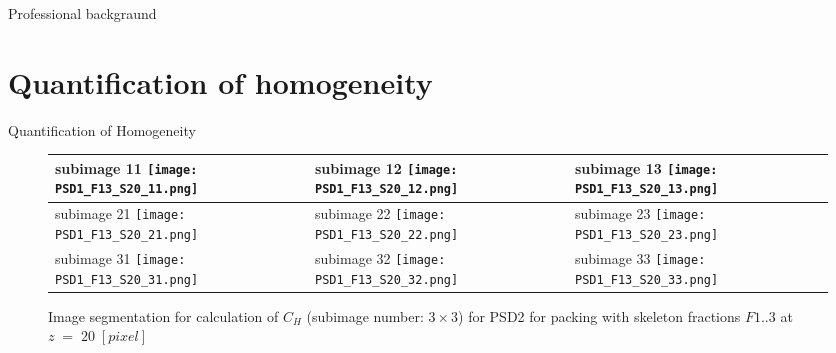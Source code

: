 \documentclass[10pt,xcolor=dvipsnames]{beamer}
\begin{document}
{\begin{frame}{Professional backgraund}
{
\section{Quantification of homogeneity}
}
{
\begin{frame}{Quantification of Homogeneity}

	\begin{figure}[H]
\centering
\begin{tabular}{ p{1.9cm} | p{1.9cm} | p{1.9cm}}

subimage 11 \newline 
\texttt{[image: PSD1\_F13\_S20\_11.png]}
&
subimage 12 \newline 
\texttt{[image: PSD1\_F13\_S20\_12.png]} 
&
subimage 13 \newline 
\texttt{[image: PSD1\_F13\_S20\_13.png]}\\

\hline 
subimage 21 \newline 
\texttt{[image: PSD1\_F13\_S20\_21.png]} 
&
subimage 22 \newline 
\texttt{[image: PSD1\_F13\_S20\_22.png]} 
&
subimage 23 \newline 
\texttt{[image: PSD1\_F13\_S20\_23.png]} \\
\hline 
subimage 31 \newline 
\texttt{[image: PSD1\_F13\_S20\_31.png]} 
&
subimage 32 \newline 
\texttt{[image: PSD1\_F13\_S20\_32.png]} 
&
subimage 33 \newline 
\texttt{[image: PSD1\_F13\_S20\_33.png]} \\
\hline 
\end{tabular}
	\caption{Image segmentation for calculation of $C_{H}$ (subimage number: $3 \times 3$) for PSD2 for packing with skeleton fractions $F1..3$ at $z\;=\;20\;[pixel]$}
	\label{tab:imagesegmentation}
\end{figure}




\end{frame}}
\end{frame}}
\end{document}

